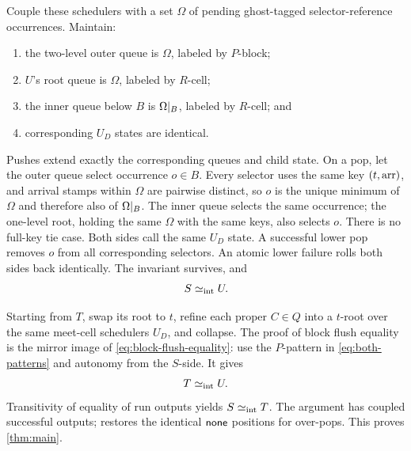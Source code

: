 Couple these schedulers with a set \(\Omega\) of pending ghost-tagged
selector-reference occurrences.  Maintain:
\begin{enumerate}
\item the two-level outer queue is \(\Omega\), labeled by \(P\)-block;
\item \(U\)'s root queue is \(\Omega\), labeled by \(R\)-cell;
\item the inner queue below \(B\) is \(\Omega\mathord{|}_{B}\), labeled by
      \(R\)-cell; and
\item corresponding \(U_D\) states are identical.
\end{enumerate}
Pushes extend exactly the corresponding queues and child state.  On a pop, let
the outer queue select occurrence \(o\in B\).  Every selector uses the same key
\((t,\operatorname{arr})\), and arrival stamps within \(\Omega\) are pairwise distinct, so
\(o\) is the unique minimum of \(\Omega\) and therefore also of
\(\Omega\mathord{|}_{B}\).  The inner queue selects the same occurrence; the
one-level root, holding the same \(\Omega\) with the same keys, also selects
\(o\).  There is no full-key tie case.  Both sides call the same \(U_D\) state.
A successful lower pop removes \(o\) from all corresponding selectors.  An
atomic lower failure rolls both sides back identically.  The invariant
survives, and
\begin{equation}
  S\mathrel{\simeq_{\mathrm{int}}} U.
  \label{eq:s-to-u}
\end{equation}

Starting from \(T\), swap its root to \(t\), refine each proper
\(C\in Q\) into a \(t\)-root over the same meet-cell schedulers \(U_D\), and
collapse.  The proof of block flush equality is the mirror image of
\autoref{eq:block-flush-equality}: use the \(P\)-pattern in
\autoref{eq:both-patterns} and autonomy from the \(S\)-side.  It gives
\begin{equation}
  T\mathrel{\simeq_{\mathrm{int}}} U.
  \label{eq:t-to-u}
\end{equation}
Transitivity of equality of run outputs yields \(S\mathrel{\simeq_{\mathrm{int}}} T\).  The argument
has coupled successful outputs;  restores the identical
\(\mathsf{none}\) positions for over-pops.  This proves \autoref{thm:main}.

